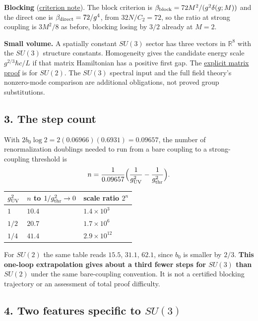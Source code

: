 \documentclass[11pt,a4paper]{article}
\begin{document}
\textbf{Blocking} (\href{blocking-criterion-monotone.md}{criterion
note}). The block criterion is
\(\beta_{\rm block}=72M^2/(g^2\delta(g;M))\) and the direct one is
\(\beta_{\rm direct}=72/g^4\), from \(32N/C_2=72\), so the ratio at
strong coupling is \(3M^2/8\) as before, blocking losing by \(3/2\)
already at \(M=2\).

\textbf{Small volume.} A spatially constant \(SU(3)\) sector has three
vectors in \(\mathbb R^8\) with the \(SU(3)\) structure constants.
Homogeneity gives the candidate energy scale \(g^{2/3}\hbar c/L\) if
that matrix Hamiltonian has a positive first gap. The
\href{low-dimensional-mass-gap.md}{explicit matrix proof} is for
\(SU(2)\). The \(SU(3)\) spectral input and the full field theory's
nonzero-mode comparison are additional obligations, not proved group
substitutions.

\hypertarget{the-step-count}{%
\subsection{3. The step count}\label{the-step-count}}

With \(2b_0\log2=2(0.06966)(0.6931)=0.09657\), the number of
renormalization doublings needed to run from a bare coupling to a
strong-coupling threshold is
\[n=\frac{1}{0.09657}\Big(\frac1{g_{\rm UV}^2}-\frac1{g_{\rm thr}^2}\Big).\]

\begin{longtable}[]{@{}lll@{}}
\toprule\noalign{}
\(g_{\rm UV}^2\) & \(n\) to \(1/g_{\rm thr}^2\to0\) & scale ratio
\(2^n\) \\
\midrule\noalign{}
\endhead
\bottomrule\noalign{}
\endlastfoot
\(1\) & \(10.4\) & \(1.4\times10^{3}\) \\
\(1/2\) & \(20.7\) & \(1.7\times10^{6}\) \\
\(1/4\) & \(41.4\) & \(2.9\times10^{12}\) \\
\end{longtable}

For \(SU(2)\) the same table reads \(15.5\), \(31.1\), \(62.1\), since
\(b_0\) is smaller by \(2/3\). \textbf{This one-loop extrapolation gives
about a third fewer steps for \(SU(3)\) than \(SU(2)\)} under the same
bare-coupling convention. It is not a certified blocking trajectory or
an assessment of total proof difficulty.

\hypertarget{two-features-specific-to-su3}{%
\subsection{\texorpdfstring{4. Two features specific to
\(SU(3)\)}{4. Two features specific to SU(3)}}\label{two-features-specific-to-su3}}
\end{document}
